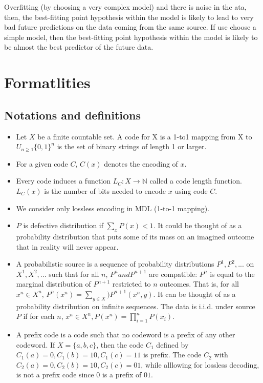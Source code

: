 \documentclass[class=article, crop=false]{standalone}
\numberwithin{equation}{section}
\begin{document}
Overfitting (by choosing a very complex model) and there is noise in the ata, then, the best-fitting point hypothesis within the model is likely to lead to very bad future predictions on the data coming from the same source. If use choose a simple model, then the best-fitting point hypothesis within the model is likely to be almost the best predictor of the future data.
\section{Formatlities}
\subsection{Notations and definitions}
\begin{itemize}
    \item Let $X$ be a finite countable set. A code for X is a 1-to1 mapping from X to $U_{n\geq 1}\{0, 1\}^n$ is the set of binary strings of length 1 or larger.
    \item For a given code $C$, $C(x)$ denotes the encoding of $x$.
    \item Every code induces a function $L_C:X\rightarrow \mathbb{N}$ called a code length function. $L_C(x)$ is the number of bits needed to encode $x$ using code $C$.
    \item We consider only lossless encoding in MDL (1-to-1 mapping). 
    \item $P$ is defective distribution if $\sum_xP(x)<1$. It could be thought of as a probability distribution that puts some of its mass on an imagined outcome that in reality will never appear.
    \item A probabilistic source is a sequence of probability distributions $P^1, P^2, ...$ on $X^1, X^2, ...$ such that for all $n$, $P^n and P^{n+1}$ are compatible: $P^n$ is equal to the marginal distribution of $P^{n+1}$ restricted to $n$ outcomes. That is, for all $x^n\in X^n$, $P^n(x^n)=\sum\limits_{y\in X})P^{n+1}(x^n, y)$. It can be thought of as a probability distribution on infinite sequences. The data is i.i.d. under source $P$ if for each $n$, $x^n\in X^n, P(x^n)=\prod \limits_{i=1}^{n}P(x_i)$.
    \item A prefix code is a code such that no codeword is a prefix of any other codeword. If $X=\{a, b, c\}$, then the code $C_1$ defined by $C_1(a)=0, C_1(b)=10, C_1(c)=11$ is prefix. The code $C_2$ with $C_2(a)=0, C_2(b)=10, C_2(c)=01$, while alllowing for lossless decoding, is not a prefix code since $0$ is a prefix of $01$.
\end{itemize}
\end{document}
